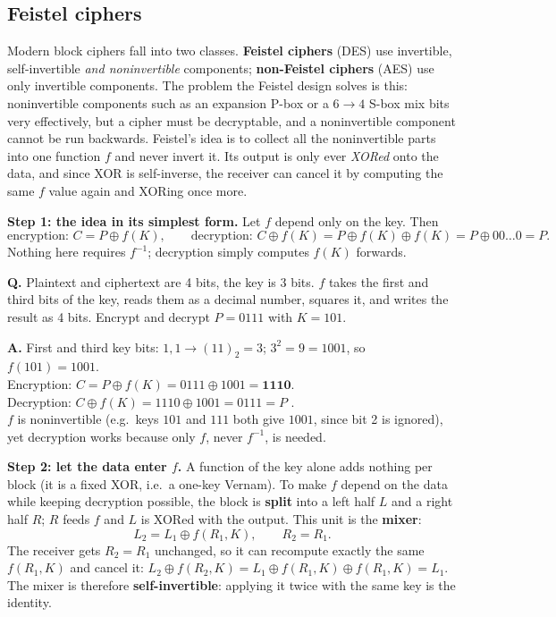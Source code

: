 \subsection{Feistel ciphers \hot}
Modern block ciphers fall into two classes. \textbf{Feistel ciphers} (DES) use invertible, self-invertible \emph{and noninvertible} components; \textbf{non-Feistel ciphers} (AES) use only invertible components. The problem the Feistel design solves is this: noninvertible components such as an expansion P-box or a $6 \to 4$ S-box mix bits very effectively, but a cipher must be decryptable, and a noninvertible component cannot be run backwards. Feistel's idea is to collect all the noninvertible parts into one function $f$ and never invert it. Its output is only ever \emph{XORed} onto the data, and since XOR is self-inverse, the receiver can cancel it by computing the same $f$ value again and XORing once more.

\textbf{Step 1: the idea in its simplest form.} Let $f$ depend only on the key. Then
\[
\text{encryption: } C = P \oplus f(K), \qquad
\text{decryption: } C \oplus f(K) = P \oplus f(K) \oplus f(K) = P \oplus 00\dots0 = P .
\]
Nothing here requires $f^{-1}$; decryption simply computes $f(K)$ forwards.

\begin{worked}
\textbf{Q.} Plaintext and ciphertext are 4 bits, the key is 3 bits. $f$ takes the first and third bits of the key, reads them as a decimal number, squares it, and writes the result as 4 bits. Encrypt and decrypt $P = 0111$ with $K = 101$.

\textbf{A.} First and third key bits: $1, 1 \to (11)_2 = 3$; $3^2 = 9 = 1001$, so $f(101) = 1001$.\\
Encryption: $C = P \oplus f(K) = 0111 \oplus 1001 = \mathbf{1110}$.\\
Decryption: $C \oplus f(K) = 1110 \oplus 1001 = 0111 = P$ \checkmark.\\
$f$ is noninvertible (e.g.\ keys $101$ and $111$ both give $1001$, since bit 2 is ignored), yet decryption works because only $f$, never $f^{-1}$, is needed.
\end{worked}

\textbf{Step 2: let the data enter $f$.} A function of the key alone adds nothing per block (it is a fixed XOR, i.e.\ a one-key Vernam). To make $f$ depend on the data while keeping decryption possible, the block is \textbf{split} into a left half $L$ and a right half $R$; $R$ feeds $f$ and $L$ is XORed with the output. This unit is the \textbf{mixer}:
\[
L_2 = L_1 \oplus f(R_1, K), \qquad R_2 = R_1 .
\]
The receiver gets $R_2 = R_1$ unchanged, so it can recompute exactly the same $f(R_1, K)$ and cancel it: $L_2 \oplus f(R_2, K) = L_1 \oplus f(R_1, K) \oplus f(R_1, K) = L_1$. The mixer is therefore \textbf{self-invertible}: applying it twice with the same key is the identity.


